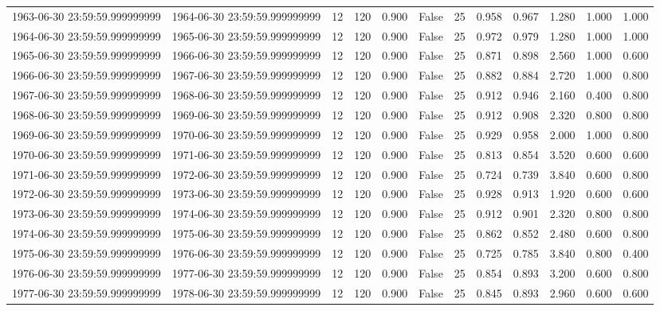 \begin{table}
\begin{tabular}{lccccccccccc}
1963-06-30 23:59:59.999999999 & 1964-06-30 23:59:59.999999999 & 12 & 120 & 0.900 & False & 25 & 0.958 & 0.967 & 1.280 & 1.000 & 1.000 \\
1964-06-30 23:59:59.999999999 & 1965-06-30 23:59:59.999999999 & 12 & 120 & 0.900 & False & 25 & 0.972 & 0.979 & 1.280 & 1.000 & 1.000 \\
1965-06-30 23:59:59.999999999 & 1966-06-30 23:59:59.999999999 & 12 & 120 & 0.900 & False & 25 & 0.871 & 0.898 & 2.560 & 1.000 & 0.600 \\
1966-06-30 23:59:59.999999999 & 1967-06-30 23:59:59.999999999 & 12 & 120 & 0.900 & False & 25 & 0.882 & 0.884 & 2.720 & 1.000 & 0.800 \\
1967-06-30 23:59:59.999999999 & 1968-06-30 23:59:59.999999999 & 12 & 120 & 0.900 & False & 25 & 0.912 & 0.946 & 2.160 & 0.400 & 0.800 \\
1968-06-30 23:59:59.999999999 & 1969-06-30 23:59:59.999999999 & 12 & 120 & 0.900 & False & 25 & 0.912 & 0.908 & 2.320 & 0.800 & 0.800 \\
1969-06-30 23:59:59.999999999 & 1970-06-30 23:59:59.999999999 & 12 & 120 & 0.900 & False & 25 & 0.929 & 0.958 & 2.000 & 1.000 & 0.800 \\
1970-06-30 23:59:59.999999999 & 1971-06-30 23:59:59.999999999 & 12 & 120 & 0.900 & False & 25 & 0.813 & 0.854 & 3.520 & 0.600 & 0.600 \\
1971-06-30 23:59:59.999999999 & 1972-06-30 23:59:59.999999999 & 12 & 120 & 0.900 & False & 25 & 0.724 & 0.739 & 3.840 & 0.600 & 0.800 \\
1972-06-30 23:59:59.999999999 & 1973-06-30 23:59:59.999999999 & 12 & 120 & 0.900 & False & 25 & 0.928 & 0.913 & 1.920 & 0.600 & 0.600 \\
1973-06-30 23:59:59.999999999 & 1974-06-30 23:59:59.999999999 & 12 & 120 & 0.900 & False & 25 & 0.912 & 0.901 & 2.320 & 0.800 & 0.800 \\
1974-06-30 23:59:59.999999999 & 1975-06-30 23:59:59.999999999 & 12 & 120 & 0.900 & False & 25 & 0.862 & 0.852 & 2.480 & 0.600 & 0.800 \\
1975-06-30 23:59:59.999999999 & 1976-06-30 23:59:59.999999999 & 12 & 120 & 0.900 & False & 25 & 0.725 & 0.785 & 3.840 & 0.800 & 0.400 \\
1976-06-30 23:59:59.999999999 & 1977-06-30 23:59:59.999999999 & 12 & 120 & 0.900 & False & 25 & 0.854 & 0.893 & 3.200 & 0.600 & 0.800 \\
1977-06-30 23:59:59.999999999 & 1978-06-30 23:59:59.999999999 & 12 & 120 & 0.900 & False & 25 & 0.845 & 0.893 & 2.960 & 0.600 & 0.600 \\

\end{tabular}
\end{table}
